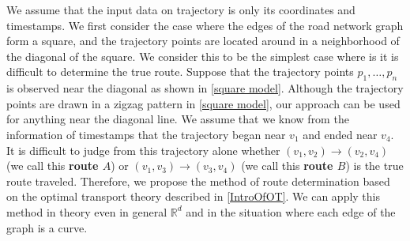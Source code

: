 \documentclass{article}
\numberwithin{equation}{section}
\theoremstyle{definition}
\begin{document}
We assume that the input data on trajectory is only its coordinates and timestamps.
We first consider the case where the edges of the road network graph form a square, and the trajectory points are located around in a neighborhood of the diagonal of the square.  We consider this to be the simplest case where is it is difficult to determine the true route. 
Suppose that the trajectory points $p_1,\ldots,p_n$ is observed near the diagonal as shown in \autoref{square model}.
Although the trajectory points are drawn in a zigzag pattern in \autoref{square model}, our approach can be used for anything near the diagonal line.
We assume that we know from the information of timestamps that the trajectory began near $v_1$ and ended near $v_4$.
It is difficult to judge from this trajectory alone whether $(v_1,v_2)\to(v_2,v_4)$ (we call this \textbf{route $A$}) or $(v_1,v_3)\to(v_3 ,v_4)$ (we call this \textbf{route $B$}) is the true route traveled.
Therefore, we propose the method of route determination based on the optimal transport theory described in \autoref{IntroOfOT}.
We can apply this method in theory even in general $\mathbb{R}^d$ and in the situation where each edge of the graph is a curve.
\end{document}
